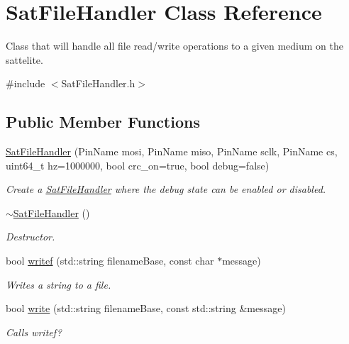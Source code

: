 \hypertarget{class_sat_file_handler}{}\section{Sat\+File\+Handler Class Reference}
\label{class_sat_file_handler}


Class that will handle all file read/write operations to a given medium on the sattelite.  




{\ttfamily \#include $<$Sat\+File\+Handler.\+h$>$}

\subsection*{Public Member Functions}
\begin{DoxyCompactItemize}
\item 
\mbox{\hyperlink{class_sat_file_handler_a077c457c3daa568f5415b3d03d01a2a2}{Sat\+File\+Handler}} (Pin\+Name mosi, Pin\+Name miso, Pin\+Name sclk, Pin\+Name cs, uint64\+\_\+t hz=1000000, bool crc\+\_\+on=true, bool debug=false)
\begin{DoxyCompactList}\small\item\em Create a \mbox{\hyperlink{class_sat_file_handler}{Sat\+File\+Handler}} where the debug state can be enabled or disabled. \end{DoxyCompactList}\item 
\mbox{\hyperlink{class_sat_file_handler_ac16f6dbdc038a207f3fd3e572f2df496}{$\sim$\+Sat\+File\+Handler}} ()
\begin{DoxyCompactList}\small\item\em Destructor. \end{DoxyCompactList}\item 
bool \mbox{\hyperlink{class_sat_file_handler_a355361c4ec4692c5b533740121976eb2}{writef}} (std\+::string filename\+Base, const char $\ast$message)
\begin{DoxyCompactList}\small\item\em Writes a string to a file. \end{DoxyCompactList}\item 
bool \mbox{\hyperlink{class_sat_file_handler_a54f30111dd898bc6ce1e0c0ce6a82350}{write}} (std\+::string filename\+Base, const std\+::string \&message)
\begin{DoxyCompactList}\small\item\em Calls writef? \end{DoxyCompactList}\item 

\end{DoxyCompactItemize}
